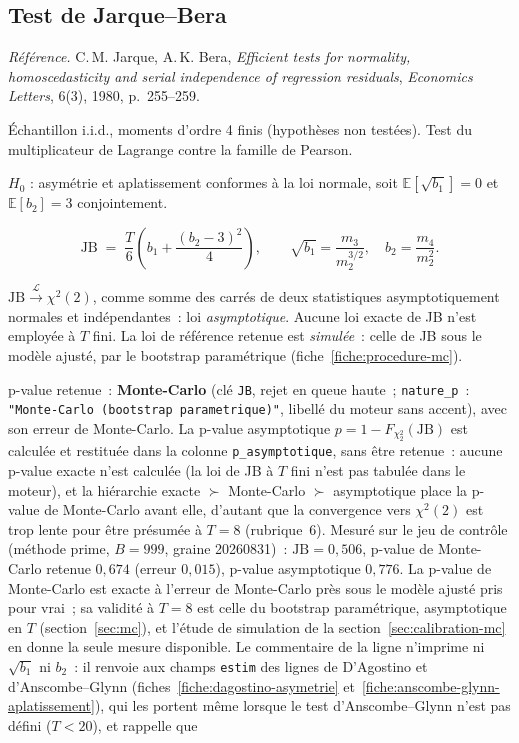 \documentclass[a4paper,11pt]{article}
\newcommand{\code}[1]{\texttt{\small #1}}
\newcommand{\refl}[1]{{\small\textcolor{maincolor!70!black}{\textit{Référence.} #1}}\par\smallskip}
\newcounter{ficheid}
\newenvironment{fiche}[1]{%
  \stepcounter{ficheid}%
  \phantomsection
  \subsection{#1}%
  \label{fiche:\theficheid}%
}{%
  \end{description}\vspace{0.5em}%
}
\newcommand{\Cadre}{%
  \begin{description}[leftmargin=0pt, style=unboxed, itemsep=3pt, topsep=3pt, parsep=2pt]%
  \item[\textcolor{financeblue}{\textbf{1. Cadre, notations et hypothèses de validité (non testées).}}]}
\newcommand{\Hzero}{\item[\textcolor{financeblue}{\textbf{2. Hypothèse nulle.}}]}
\newcommand{\Stat}{\item[\textcolor{financeblue}{\textbf{3. Statistique de test.}}]}
\newcommand{\Loi}{\item[\textcolor{financeblue}{\textbf{4. Loi sous $H_0$.}}]}
\newcommand{\Pval}{\item[\textcolor{financeblue}{\textbf{5. p-value.}}]}
\begin{document}
\begin{fiche}{Test de Jarque--Bera}
\label{fiche:jarque-bera}%
\refl{C.\,M. Jarque, A.\,K. Bera, \emph{Efficient tests for normality, homoscedasticity and
serial independence of regression residuals}, \emph{Economics Letters}, 6(3), 1980, p.~255--259.}
\Cadre
Échantillon i.i.d., moments d'ordre 4 finis (hypothèses non testées). Test du multiplicateur de
Lagrange contre la famille de Pearson.
\Hzero
$H_0$ : asymétrie et aplatissement conformes à la loi normale, soit $\mathbb{E}[\sqrt{b_1}] = 0$
et $\mathbb{E}[b_2] = 3$ conjointement.
\Stat
\[
  \mathrm{JB} \;=\; \frac{T}{6}\left(b_1 + \frac{(b_2-3)^2}{4}\right),
  \qquad
  \sqrt{b_1} = \frac{m_3}{m_2^{3/2}},\quad b_2 = \frac{m_4}{m_2^{2}} .
\]
\Loi
$\mathrm{JB} \xrightarrow{\ \mathcal{L}\ } \chi^2(2)$, comme somme des carrés de deux
statistiques asymptotiquement normales et indépendantes~: loi \emph{asymptotique}. Aucune loi
exacte de JB n'est employée à $T$ fini. La loi de référence retenue est \emph{simulée}~: celle
de JB sous le modèle ajusté, par le bootstrap paramétrique (fiche~\ref{fiche:procedure-mc}).
\Pval
p-value retenue~: \textbf{Monte-Carlo} (clé \code{JB}, rejet en queue haute~;
\code{nature\_p}~: \code{"Monte-Carlo (bootstrap parametrique)"}, libellé du moteur sans
accent), avec son erreur de Monte-Carlo.
La p-value asymptotique $p = 1 - F_{\chi^2_2}(\mathrm{JB})$ est calculée et restituée dans la
colonne \code{p\_asymptotique}, sans être retenue~: aucune p-value exacte n'est calculée (la loi de JB à $T$ fini n'est pas
tabulée dans le moteur), et la
hiérarchie exacte $\succ$ Monte-Carlo $\succ$ asymptotique place la p-value de Monte-Carlo avant
elle, d'autant que la convergence vers $\chi^2(2)$ est trop lente pour être présumée à $T = 8$
(rubrique~6). Mesuré sur le jeu de contrôle (méthode prime, $B = 999$, graine 20260831)~:
$\mathrm{JB} = 0{,}506$, p-value de Monte-Carlo retenue $0{,}674$ (erreur $0{,}015$), p-value
asymptotique $0{,}776$. La p-value de Monte-Carlo est exacte à l'erreur de Monte-Carlo près
sous le modèle ajusté pris pour vrai~; sa validité à $T = 8$ est celle du bootstrap
paramétrique, asymptotique en $T$ (section~\ref{sec:mc}), et l'étude de simulation de la
section~\ref{sec:calibration-mc} en donne la seule mesure disponible. Le commentaire de la ligne n'imprime ni $\sqrt{b_1}$ ni
$b_2$~: il renvoie aux champs \code{estim} des lignes de D'Agostino et d'Anscombe--Glynn
(fiches~\ref{fiche:dagostino-asymetrie} et~\ref{fiche:anscombe-glynn-aplatissement}), qui les
portent même lorsque le test d'Anscombe--Glynn n'est pas défini ($T < 20$), et rappelle que

\end{fiche}
\end{document}
